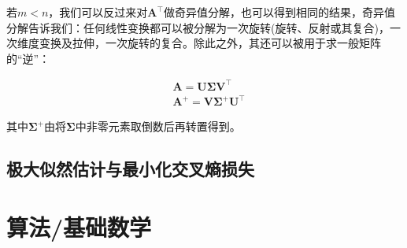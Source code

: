 \documentclass[UTF8]{book}
\begin{document}
若$m<n$，我们可以反过来对$\mathbf{A}^\top$做奇异值分解，也可以得到相同的结果，奇异值分解告诉我们：任何线性变换都可以被分解为一次旋转(旋转、反射或其复合)，一次维度变换及拉伸，一次旋转的复合。除此之外，其还可以被用于求一般矩阵的“逆”：
\begin{large}
    \begin{equation}
        \begin{aligned}
            &\mathbf{A}=\mathbf{U}\mathbf{\Sigma}\mathbf{V}^\top \\
            &\mathbf{A}^+=\mathbf{V}\mathbf{\Sigma}^+\mathbf{U}^\top
            \nonumber
        \end{aligned}
    \end{equation}
\end{large}
其中$\mathbf{\Sigma}^+$由将$\mathbf{\Sigma}$中非零元素取倒数后再转置得到。

\subsection{极大似然估计与最小化交叉熵损失}

\section{算法/基础数学}
\end{document}

